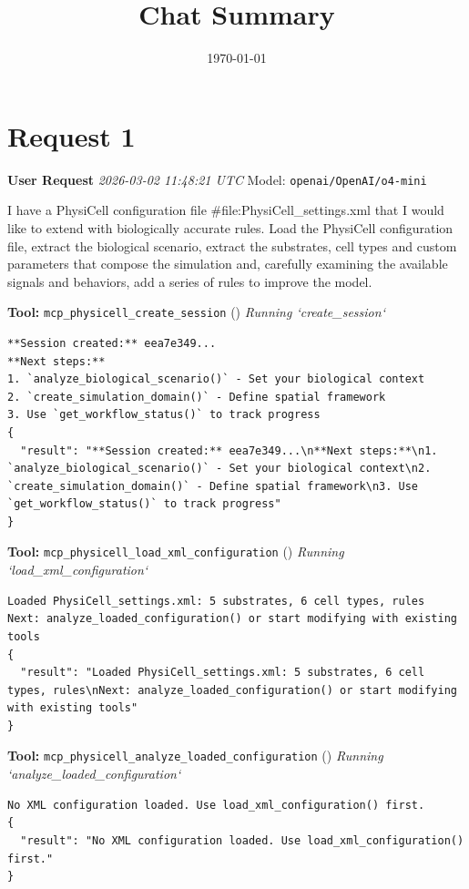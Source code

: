 \documentclass[11pt,a4paper]{article}
\title{Chat Summary}
\date{\today}
\begin{document}
\maketitle
\tableofcontents
\newpage

\section{Request 1}
\begin{userbox}
\textbf{User Request}
\quad \textit{2026-03-02 11:48:21 UTC}
\quad Model: \texttt{openai/OpenAI/o4-mini}

I have a PhysiCell configuration file \#file:PhysiCell\_settings.xml  that I would like to extend with biologically accurate rules. Load the PhysiCell configuration file, extract the biological scenario, extract the substrates, cell types and custom parameters that compose the simulation and, carefully examining the available signals and behaviors, add a series of rules to improve the model.

\end{userbox}
\begin{toolokbox}
\textbf{Tool:} \texttt{mcp\_physicell\_create\_session} (\checkmark)
\textit{Running `create\_session`}
\begin{lstlisting}
**Session created:** eea7e349...
**Next steps:**
1. `analyze_biological_scenario()` - Set your biological context
2. `create_simulation_domain()` - Define spatial framework
3. Use `get_workflow_status()` to track progress
{
  "result": "**Session created:** eea7e349...\n**Next steps:**\n1. `analyze_biological_scenario()` - Set your biological context\n2. `create_simulation_domain()` - Define spatial framework\n3. Use `get_workflow_status()` to track progress"
}
\end{lstlisting}
\end{toolokbox}
\begin{toolokbox}
\textbf{Tool:} \texttt{mcp\_physicell\_load\_xml\_configuration} (\checkmark)
\textit{Running `load\_xml\_configuration`}
\begin{lstlisting}
Loaded PhysiCell_settings.xml: 5 substrates, 6 cell types, rules
Next: analyze_loaded_configuration() or start modifying with existing tools
{
  "result": "Loaded PhysiCell_settings.xml: 5 substrates, 6 cell types, rules\nNext: analyze_loaded_configuration() or start modifying with existing tools"
}
\end{lstlisting}
\end{toolokbox}
\begin{toolokbox}
\textbf{Tool:} \texttt{mcp\_physicell\_analyze\_loaded\_configuration} (\checkmark)
\textit{Running `analyze\_loaded\_configuration`}
\begin{lstlisting}
No XML configuration loaded. Use load_xml_configuration() first.
{
  "result": "No XML configuration loaded. Use load_xml_configuration() first."
}
\end{lstlisting}
\end{toolokbox}
\end{document}
